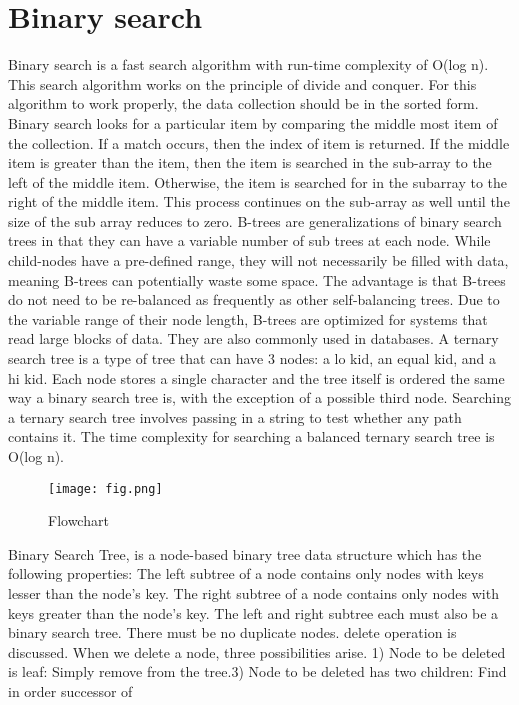 \documentclass{article}
\begin{document}
\section{Binary search}
Binary search is a fast search algorithm with run-time
complexity of Ο(log n). This search algorithm works
on the principle of divide and conquer. For this
algorithm to work properly, the data collection should
be in the sorted form.
Binary search looks for a particular item by
comparing the middle most item of the collection. If a
match occurs, then the index of item is returned. If the
middle item is greater than the item, then the item is
searched in the sub-array to the left of the middle
item. Otherwise, the item is searched for in the subarray to the right of the middle item. This process
continues on the sub-array as well until the size of the
sub array reduces to zero. B-trees are generalizations
of binary search trees in that they can have a variable
number of sub trees at each node. While child-nodes
have a pre-defined range, they will not necessarily be
filled with data, meaning B-trees can potentially waste
some space. The advantage is that B-trees do not need
to be re-balanced as frequently as other self-balancing
trees.
Due to the variable range of their node length, B-trees
are optimized for systems that read large blocks of
data. They are also commonly used in databases. A
ternary search tree is a type of tree that can have 3
nodes: a lo kid, an equal kid, and a hi kid. Each node
stores a single character and the tree itself is ordered
the same way a binary search tree is, with the
exception of a possible third node. Searching a ternary
search tree involves passing in a string to test whether
any path contains it. The time complexity for
searching a balanced ternary search tree is O(log n).
\begin{figure}
    \centering
    \texttt{[image: fig.png]}
    \caption{Flowchart}
    \label{fig:my_label}
\end{figure}
Binary Search Tree, is a node-based binary tree
data structure which has the following properties:
The left subtree of a node contains only nodes with
keys lesser than the node’s key. The right subtree of a
node contains only nodes with keys greater than the
node’s key. The left and right subtree each must also
be a binary search tree. There must be no duplicate
nodes. delete operation is discussed. When we delete
a node, three possibilities arise. 1) Node to be deleted
is leaf: Simply remove from the tree.3) Node to be
deleted has two children: Find in order successor of
\end{document}

